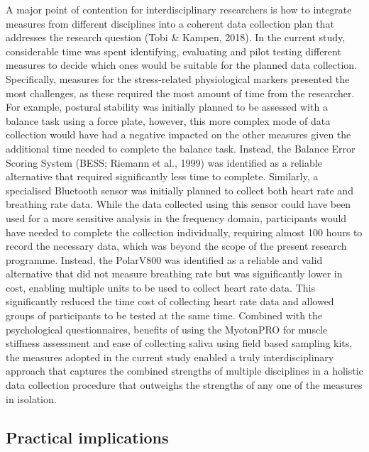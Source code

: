 \documentclass[man,floatsintext]{apa6}
\begin{document}
A major point of contention for interdisciplinary researchers is how to integrate measures from different disciplines into a coherent data collection plan that addresses the research question (Tobi \& Kampen, 2018).
In the current study, considerable time was spent identifying, evaluating and pilot testing different measures to decide which ones would be suitable for the planned data collection.
Specifically, measures for the stress-related physiological markers presented the most challenges, as these required the most amount of time from the researcher.
For example, postural stability was initially planned to be assessed with a balance task using a force plate, however, this more complex mode of data collection would have had a negative impacted on the other measures given the additional time needed to complete the balance task.
Instead, the Balance Error Scoring System (BESS; Riemann et al., 1999) was identified as a reliable alternative that required significantly less time to complete.
Similarly, a specialised Bluetooth sensor was initially planned to collect both heart rate and breathing rate data.
While the data collected using this sensor could have been used for a more sensitive analysis in the frequency domain, participants would have needed to complete the collection individually, requiring almost 100 hours to record the necessary data, which was beyond the scope of the present research programme.
Instead, the PolarV800 was identified as a reliable and valid alternative that did not measure breathing rate but was significantly lower in cost, enabling multiple units to be used to collect heart rate data.
This significantly reduced the time cost of collecting heart rate data and allowed groups of participants to be tested at the same time.
Combined with the psychological questionnaires, benefits of using the MyotonPRO for muscle stiffness assessment and ease of collecting saliva using field based sampling kits, the measures adopted in the current study enabled a truly interdisciplinary approach that captures the combined strengths of multiple disciplines in a holistic data collection procedure that outweighs the strengths of any one of the measures in isolation.

\hypertarget{practical-implications}{%
\subsection{Practical implications}\label{practical-implications}}
\end{document}

